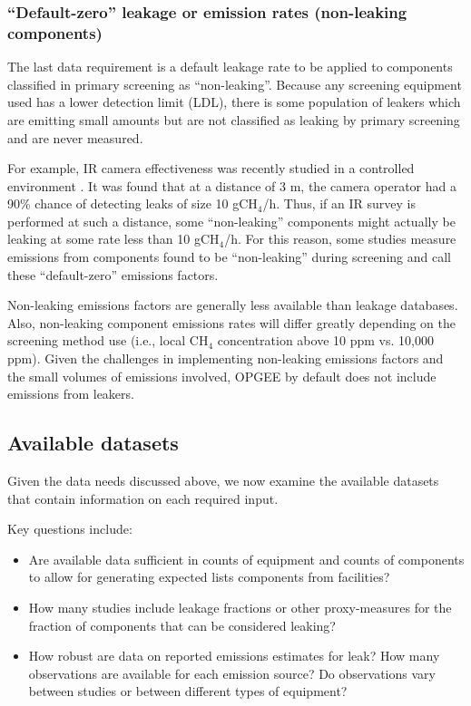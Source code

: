 \documentclass[11pt]{report}
\begin{document}
\subsubsection{``Default-zero'' leakage or emission rates (non-leaking components)}

The last data requirement is a default leakage rate to be applied to components classified in primary screening as ``non-leaking''. Because any screening equipment used has a lower detection limit (LDL), there is some population of leakers which are emitting small amounts but are not classified as leaking by primary screening and are never measured. 

For example, IR camera effectiveness was recently studied in a controlled environment \cite{Ravikumar2018}. It was found that at a distance of 3 m, the camera operator had a 90\% chance of detecting leaks of size 10 gCH$_4$/h. Thus, if an IR survey is performed at such a distance, some ``non-leaking'' components might actually be leaking at some rate less than 10 gCH$_4$/h. For this reason, some studies measure emissions from components found to be ``non-leaking'' during screening and call these ``default-zero'' emissions factors.

Non-leaking emissions factors are generally less available than leakage databases. Also, non-leaking component emissions rates will differ greatly depending on the screening method use (i.e., local CH$_4$ concentration above 10 ppm vs. 10,000 ppm). Given the challenges in implementing non-leaking emissions factors and the small volumes of emissions involved, OPGEE by default does not include emissions from leakers.


\subsection{Available datasets}


Given the data needs discussed above, we now examine the available datasets that contain information on each required input.

Key questions include: 
\begin{itemize}
\item Are available data sufficient in counts of equipment and counts of components to allow for generating expected lists components from facilities? 
\item How many studies include leakage fractions or other proxy-measures for the fraction of components that can be considered leaking?
\item How robust are data on reported emissions estimates for leak? How many observations are available for each emission source? Do observations vary between studies or between different types of equipment?
\end{itemize}
\end{document}

